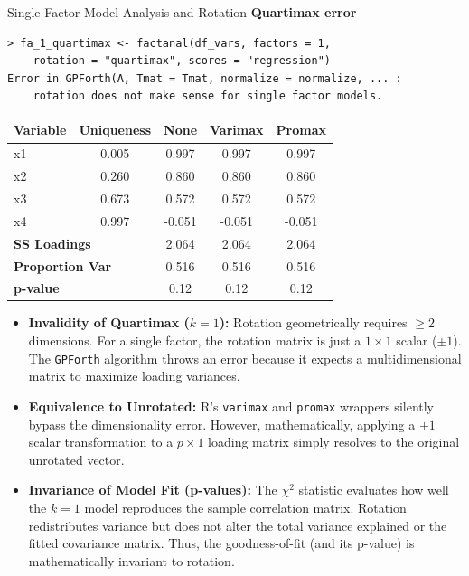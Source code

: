 \documentclass[8pt, aspectratio=169]{beamer}
\begin{document}
\begin{frame}[fragile]{Single Factor Model Analysis and Rotation}
\textbf{Quartimax error}
\scriptsize \begin{verbatim}
> fa_1_quartimax <- factanal(df_vars, factors = 1, 
    rotation = "quartimax", scores = "regression")
Error in GPForth(A, Tmat = Tmat, normalize = normalize, ... : 
    rotation does not make sense for single factor models.
        \end{verbatim}
    

\vspace{-0.3cm}
\begin{table}[]
    \centering
    \footnotesize
    \begin{tabular}{lcccc}
        \toprule
        \textbf{Variable} & \textbf{Uniqueness} & \textbf{None} & \textbf{Varimax} & \textbf{Promax} \\
        \midrule
        x1 & 0.005 & 0.997 & 0.997 & 0.997 \\
        x2 & 0.260 & 0.860 & 0.860 & 0.860 \\
        x3 & 0.673 & 0.572 & 0.572 & 0.572 \\
        x4 & 0.997 & -0.051 & -0.051 & -0.051 \\
        \midrule
        \multicolumn{2}{l}{\textbf{SS Loadings}} & 2.064 & 2.064 & 2.064 \\
        \multicolumn{2}{l}{\textbf{Proportion Var}} & 0.516 & 0.516 & 0.516 \\
        \multicolumn{2}{l}{\textbf{p-value}} & 0.12 & 0.12 & 0.12 \\
        \bottomrule
    \end{tabular}
    
    \vspace{-0.1cm}
\end{table}

\vspace{-0.2cm}
\normalsize
\begin{itemize}
    \item \textbf{Invalidity of Quartimax ($k=1$):} Rotation geometrically requires $\ge 2$ dimensions. For a single factor, the rotation matrix is just a $1 \times 1$ scalar ($\pm 1$). The \texttt{GPForth} algorithm throws an error because it expects a multidimensional matrix to maximize loading variances.
    \item \textbf{Equivalence to Unrotated:} R's \texttt{varimax} and \texttt{promax} wrappers silently bypass the dimensionality error. However, mathematically, applying a $\pm 1$ scalar transformation to a $p \times 1$ loading matrix simply resolves to the original unrotated vector.
    \item \textbf{Invariance of Model Fit (p-values):} The $\chi^2$ statistic evaluates how well the $k=1$ model reproduces the sample correlation matrix. Rotation redistributes variance but does not alter the total variance explained or the fitted covariance matrix. Thus, the goodness-of-fit (and its p-value) is mathematically invariant to rotation.
\end{itemize}
\end{frame}
\end{document}
